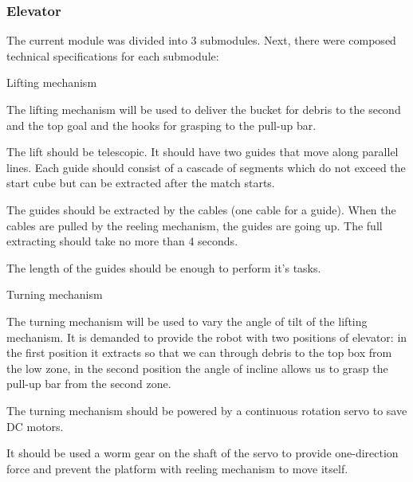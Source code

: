 \subsubsection{Elevator}

\begin{enumerate*}

  \item The current module was divided into 3 submodules. Next, there were composed technical specifications for each submodule:
  \begin{enumerate*}
  	\item Lifting mechanism
  	\begin{enumerate*}
  		\item The lifting mechanism will be used to deliver the bucket for debris to the second and the top goal and the hooks for grasping to the pull-up bar.
  		
  		\item The lift should be telescopic. It should have two guides that move along parallel lines. Each guide should consist of a cascade of segments which do not exceed the start cube but can be extracted after the match starts.
  		
  		\item The guides should be extracted by the cables (one cable for a guide). When the cables are pulled by the reeling mechanism, the guides are going up. The full extracting should take no more than 4 seconds.
  		
  		\item  The length of the guides should be enough to perform it's tasks.
  		
  	\end{enumerate*}
  	
  	\item Turning mechanism
  	\begin{enumerate*}
  		\item The turning mechanism will be used to vary the angle of tilt of the lifting mechanism. It is demanded to provide the robot with two positions of elevator: in the first position it extracts so that we can through debris to the top box from the low zone, in the second position the angle of incline allows us to grasp the pull-up bar from the second zone.
  		
  		\item The turning mechanism should be powered by a continuous rotation servo to save DC motors.
  		
  		\item It should be used a worm gear on the shaft of the servo to provide one-direction force and prevent the platform with reeling mechanism to move itself.
  		

\end{enumerate*}
\end{enumerate*}
\end{enumerate*}
